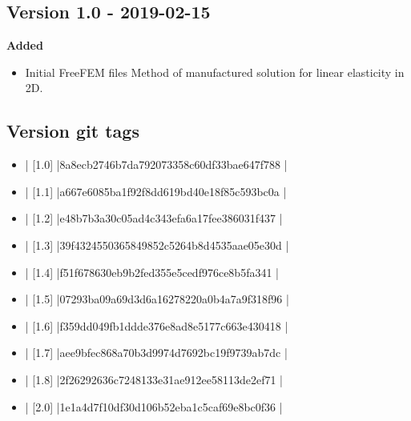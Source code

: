 \subsection{Version 1.0 - 2019-02-15}

\textbf{Added}
\begin{itemize}
\item Initial FreeFEM files  Method of manufactured solution for linear elasticity in 2D.
\end{itemize}

\subsection{Version git tags}
\begin{itemize}
\item | [1.0]      |8a8ecb2746b7da792073358c60df33bae647f788 |
\item | [1.1]     |a667e6085ba1f92f8dd619bd40e18f85c593bc0a |
\item | [1.2]        |e48b7b3a30c05ad4c343efa6a17fee386031f437 |
\item | [1.3]       |39f4324550365849852c5264b8d4535aae05e30d |
\item | [1.4]        |f51f678630eb9b2fed355e5cedf976ce8b5fa341 |
\item | [1.5]        |07293ba09a69d3d6a16278220a0b4a7a9f318f96 |
\item | [1.6]        |f359dd049fb1ddde376e8ad8e5177c663e430418 |
\item | [1.7]       |aee9bfec868a70b3d9974d7692bc19f9739ab7dc |
\item | [1.8]       |2f26292636c7248133e31ae912ee58113de2ef71 |
\item | [2.0]       |1e1a4d7f10df30d106b52eba1c5caf69e8bc0f36 |
\end{itemize}
